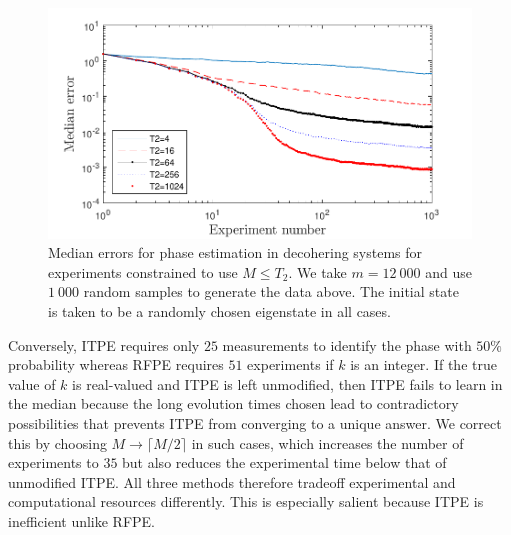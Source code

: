 \documentclass[aps,prl,amsmath,twocolumn,amssymb,superscriptaddress]{revtex4-1}
\begin{document}
\begin{figure}[t!]
    \begin{centering}
\includegraphics[width=0.95\linewidth]{T2plot_full.pdf}
    \end{centering}
    \caption{\label{fig:T2plot}
Median errors for phase estimation in decohering systems for experiments constrained to use $M\le T_2$.  We take $m=12~000$ and use $1~000$ random samples to generate the data above.  The initial state is taken to be a randomly chosen eigenstate in all cases.
    }
\end{figure}
Conversely,
ITPE requires only $25$ measurements to identify the phase with $50\%$
probability whereas RFPE requires $51$ experiments if $k$ is an integer.  If
the true value of $k$ is real-valued and ITPE is left unmodified, then  ITPE
fails to learn in the median because the long evolution times chosen lead to
contradictory possibilities that prevents ITPE from converging to a unique answer.  We correct
this by choosing $M\rightarrow \lceil M/2\rceil$ in such cases, which increases the number
of experiments to $35$ but also reduces the experimental time below that of
unmodified ITPE.  All three methods therefore
tradeoff experimental and computational resources differently.  This is especially salient because ITPE is inefficient unlike RFPE.
\end{document}

